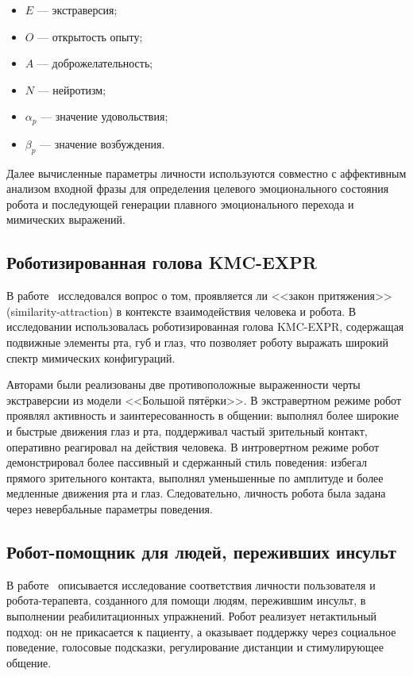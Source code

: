\begin{itemize}
	\item $E$ --- экстраверсия;
	\item $O$ --- открытость опыту;
	\item $A$ --- доброжелательность;
	\item $N$ --- нейротизм;
	\item $\alpha_p$ --- значение удовольствия;
	\item $\beta_p$ --- значение возбуждения.
\end{itemize}

Далее вычисленные параметры личности используются совместно с аффективным анализом входной фразы для определения целевого эмоционального состояния робота и последующей генерации плавного эмоционального перехода и мимических выражений.

\subsection{Роботизированная голова KMC-EXPR}

В работе~\cite{park2012lawofattraction} исследовался вопрос о том, проявляется ли <<закон притяжения>> (similarity-attraction) в контексте взаимодействия человека и робота.
В исследовании использовалась роботизированная голова KMC-EXPR, содержащая подвижные элементы рта, губ и глаз, что позволяет роботу выражать широкий спектр мимических конфигураций.

Авторами были реализованы две противоположные выраженности черты экстраверсии из модели <<Большой пятёрки>>.
В экстравертном режиме робот проявлял активность и заинтересованность в общении: выполнял более широкие и быстрые движения глаз и рта, поддерживал частый зрительный контакт, оперативно реагировал на действия человека.
В интровертном режиме робот демонстрировал более пассивный и сдержанный стиль поведения: избегал прямого зрительного контакта, выполнял уменьшенные по амплитуде и более медленные движения рта и глаз.
Следовательно, личность робота была задана через невербальные параметры поведения.

\subsection{Робот-помощник для людей, переживших инсульт}

В работе~\cite{tapus2008personalitymatching} описывается исследование соответствия личности пользователя и робота-терапевта, созданного для помощи людям, пережившим инсульт, в выполнении реабилитационных упражнений.
Робот реализует нетактильный подход: он не прикасается к пациенту, а оказывает поддержку через социальное поведение, голосовые подсказки, регулирование дистанции и стимулирующее общение.

